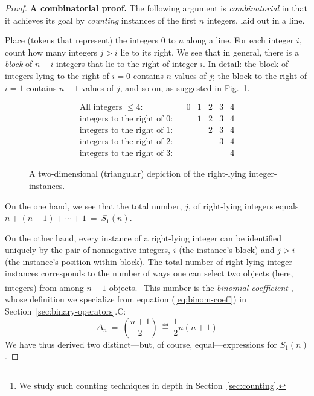 \begin{proof}
{\bf A combinatorial proof.}
The following argument is {\it combinatorial} in that it achieves its goal by {\em counting} instances of the first $n$ integers, laid out in a line.

\smallskip

Place (tokens that represent) the integers $0$ to $n$ along a line.  For each integer $i$, count how many integers $j > i$ lie to its right.  We see that in general, there is a {\it block} of $n-i$ integers that lie to the right of integer $i$.  In detail: the block of integers lying to the right of $i=0$ contains $n$ values of $j$; the block to the right of $i=1$ contains $n-1$ values of $j$, and so on, as suggested in Fig.~\ref{fig:rightward-instances}.
\begin{figure}[htb]
\[
\begin{array}{lcccccc}
\mbox{All integers $\leq 4$:} &
 & 0 & 1 & 2 & 3 & 4 \\
\mbox{integers to the right of $0$:} &
 &   & 1 & 2 & 3 & 4 \\
\mbox{integers to the right of $1$:} &
 &   &   & 2 & 3 & 4 \\
\mbox{integers to the right of $2$:} &
 &   &   &   & 3 & 4 \\
\mbox{integers to the right of $3$:} &
 &   &   &   &   & 4
\end{array}
\]
\caption{A two-dimensional (triangular) depiction of the right-lying integer-instances.}
\label{fig:rightward-instances}
\end{figure}

\smallskip

On the one hand, we see that the total number, $j$, of right-lying integers equals $n+(n-1)+ \cdots + 1 \ = \ S_1(n)$.

\smallskip

On the other hand, every instance of a right-lying integer can be identified uniquely by the pair of nonnegative integers, $i$ (the instance's block) and $j>i$ (the instance's position-within-block).
The total number of right-lying integer-instances corresponds to the number of ways one can select two objects (here, integers) from among $n+1$ objects.\footnote{We study such counting techniques in depth in Section~\ref{sec:counting}.}  This number is the {\it binomial coefficient }, whose definition we specialize from equation (\ref{eq:binom-coeff}) in Section~\ref{sec:binary-operators}.C:
\[
\Delta_n  \ = \  {{n+1} \choose 2}  \  \eqdef  \  \frac{1}{2} n(n+1)
\]
We have thus derived two distinct---but, of course, equal---expressions for $S_1(n)$.
\end{proof}

